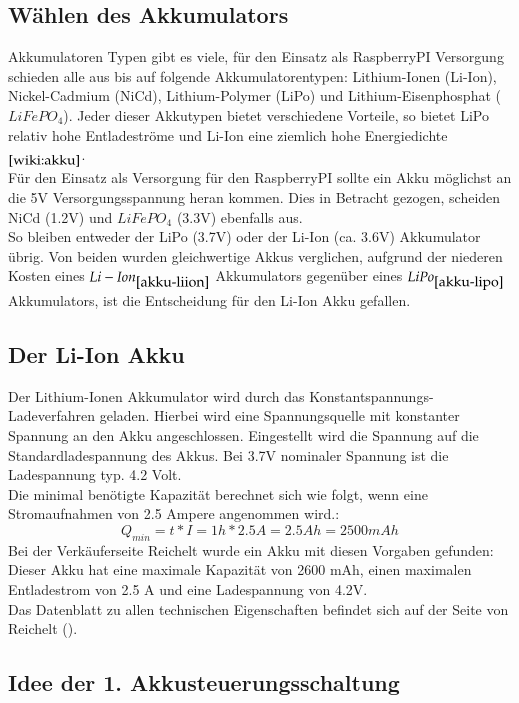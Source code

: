 \documentclass[12pt,a4paper]{article}
\begin{document}
{\subsection{Wählen des Akkumulators}
\label{SUBSEC:CHOOSE-AKKU}

Akkumulatoren Typen gibt es viele, für den Einsatz als RaspberryPI Versorgung schieden alle aus bis auf folgende Akkumulatorentypen: Lithium-Ionen (Li-Ion), Nickel-Cadmium (NiCd),  Lithium-Polymer (LiPo) und Lithium-Eisenphosphat ($LiFePO_4$). Jeder dieser Akkutypen bietet verschiedene Vorteile, so bietet LiPo relativ hohe Entladeströme und Li-Ion eine ziemlich hohe Energiedichte $_{\cite{wiki:akku}}$. \\
Für den Einsatz als Versorgung für den RaspberryPI sollte ein Akku möglichst an die 5V Versorgungsspannung heran kommen. Dies in Betracht gezogen, scheiden NiCd (1.2V) und $LiFePO_4$ (3.3V) ebenfalls aus. \\
So bleiben entweder der LiPo (3.7V) oder der Li-Ion (ca. 3.6V) Akkumulator übrig. Von beiden wurden gleichwertige Akkus verglichen, aufgrund der niederen Kosten eines $Li-Ion_{\cite{akku-liion}}$ Akkumulators gegenüber eines $LiPo_{\cite{akku-lipo}}$ Akkumulators, ist die Entscheidung für den Li-Ion Akku gefallen.

\subsection{Der Li-Ion Akku}
\label{SUBSEC:LIION}

Der Lithium-Ionen Akkumulator wird durch das Konstantspannungs-Ladeverfahren geladen. Hierbei wird eine Spannungsquelle mit konstanter Spannung an den Akku angeschlossen. Eingestellt wird die Spannung auf die Standardladespannung des Akkus. Bei 3.7V nominaler Spannung ist die Ladespannung typ. 4.2 Volt. \\
Die minimal benötigte Kapazität berechnet sich wie folgt, wenn eine Stromaufnahmen von 2.5 Ampere angenommen wird.:
\[Q_{min} = t*I = 1h * 2.5A = 2.5 Ah = 2500 mAh\]
Bei der Verkäuferseite Reichelt wurde ein Akku mit diesen Vorgaben gefunden: \cite{akku-liion}\\
Dieser Akku hat eine maximale Kapazität von 2600 mAh, einen maximalen Entladestrom von 2.5 A und eine Ladespannung von 4.2V. \\[1ex]
Das Datenblatt zu allen technischen Eigenschaften befindet sich auf der Seite von Reichelt (\cite{akku-liion}).

\subsection{Idee der 1. Akkusteuerungsschaltung}
\label{SUBSEC:AKKUSTEUR1}

}
\end{document}
